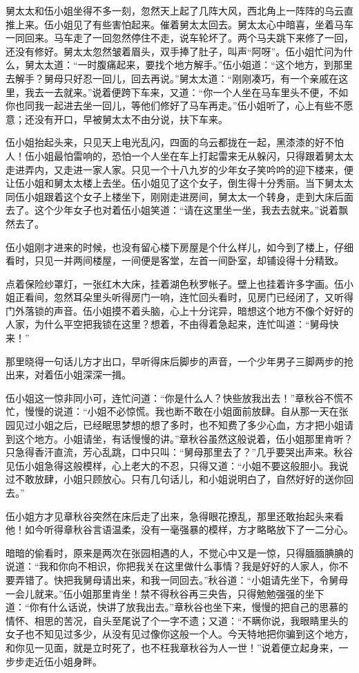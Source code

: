 \documentclass[12pt,UTF8]{ctexbook}
\begin{document}
{{{舅太太和伍小姐坐得不多一刻，忽然天上起了几阵大风，西北角上一阵阵的乌云直推上来。伍小姐见了有些害怕起来。催着舅太太回去。舅太太心中暗喜，坐着马车一同回来。马车走了一回忽然停住不走，说车轮坏了。两个马夫跳下来修了一回，还没有修好。舅太太忽然皱着眉头，双手捧了肚子，叫声“阿呀”。伍小姐忙问为什么，舅太太道：“一时腹痛起来，要找个地方解手。”伍小姐道：“这个地方，到那里去解手？舅母只好忍一回儿，回去再说。”舅太太道：“刚刚凑巧，有一个亲戚在这里，我去一去就来。”说着便跨下车来，又道：“你一个人坐在马车里头不便，不如你也同我一起进去坐一回儿，等他们修好了马车再走。”伍小姐听了，心上有些不愿意；还没有开口，早被舅太太不由分说，扶下车来。

伍小姐抬起头来，只见天上电光乱闪，四面的乌云都拢在一起，黑漆漆的好不怕人！伍小姐最怕雷响的，恐怕一个人坐在车上打起雷来无从躲闪，只得跟着舅太太走进弄内，又走进一家人家。只见一个十八九岁的少年女子笑吟吟的迎下楼来，便让伍小姐和舅太太楼上去坐。伍小姐见了这个女子，倒生得十分秀丽。当下舅太太同伍小姐跟着这个女子上楼坐下，刚刚走进房间，舅太太一个转身，走到大床后面去了。这个少年女子也对着伍小姐笑道：“请在这里坐一坐，我去去就来。”说着飘然去了。

伍小姐刚才进来的时候，也没有留心楼下房屋是个什么样儿，如今到了楼上，仔细看时，只见一并两间楼屋，一间便是客堂，左首一间卧室，却铺设得十分精致。

点着保险纱罩灯，一张红木大床，挂着湖色秋罗帐子。壁上也挂着许多字画。伍小姐正看间，忽然耳朵里头听得房门一响，连忙回头看时，见房门已经闭了，又听得门外落锁的声音。伍小姐摸不着头脑，心上十分诧异，暗想这个地方不像个好好的人家，为什么平空把我锁在这里？想着，不由得着急起来，连忙叫道：“舅母快来！”

那里晓得一句话儿方才出口，早听得床后脚步的声音，一个少年男子三脚两步的抢出来，对着伍小姐深深一揖。

伍小姐这一惊非同小可，连忙问道：“你是什么人？快些放我出去！”章秋谷不慌不忙，慢慢的说道：“小姐不必惊慌。我也断不敢在小姐面前放肆。自从那一天在张园见过小姐之后，已经眠思梦想的想了多时，也不知费了多少心血，方才把小姐请到这个地方。小姐请坐，有话慢慢的讲。”章秋谷虽然这般说着，伍小姐那里肯听？只急得香汗直流，芳心乱跳，口中只叫：“舅母那里去了？”几乎要哭出声来。秋谷见伍小姐急得这般模样，心上老大的不忍，只得又道：“小姐不要这般胆小。我说过不敢放肆，小姐只顾放心。只有几句话儿，和小姐说明白了，自然好好的送你回去。”

伍小姐方才见章秋谷突然在床后走了出来，急得眼花撩乱，那里还敢抬起头来看他！如今听得章秋谷言语温柔，没有一毫强暴的模样，方才略略放下了一二分心。

暗暗的偷看时，原来是两次在张园相遇的人，不觉心中又是一惊，只得腼腼腆腆的说道：“我和你向不相识，你把我关在这里做什么事情？我是好好的人家人，你不要弄错了。快把我舅母请出来，和我一同回去。”秋谷道：“小姐请先坐下，令舅母一会儿就来。”伍小姐那里肯坐！禁不得秋谷再三央告，只得勉勉强强的坐下道：“你有什么话说，快讲了放我出去。”章秋谷也坐下来，慢慢的把自己的思慕的情怀、相思的苦况，自头至尾说了个一字不遗；又道：“不瞒你说，我眼睛里头的女子也不知见过多少，从没有见过像你这般一个人。今天特地把你骗到这个地方，和你见一见面，就是立时死了，也不枉我章秋谷为人一世！”说着便立起身来，一步步走近伍小姐身畔。

}}}
\end{document}
